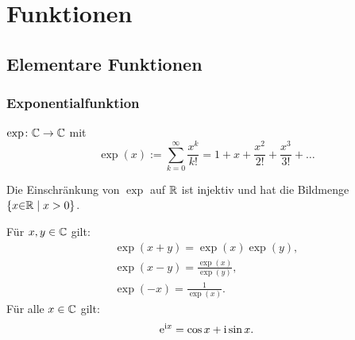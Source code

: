 
\chapter{Funktionen}
\section{Elementare Funktionen}
\subsection{Exponentialfunktion}
\begin{Definition}
$\exp\colon\mathbb C\to\mathbb C$ mit
\begin{equation}
\exp(x) := \sum_{k=0}^{\infty} \frac{x^k}{k!}
= 1+x+\frac{x^2}{2!}+\frac{x^3}{3!}+\ldots
\end{equation}
\end{Definition}
\noindent
Die Einschränkung von $\exp$ auf $\mathbb R$ ist injektiv und
hat die Bildmenge $\{x{\in}\mathbb R\mid x>0\}$.

Für $x,y\in\mathbb C$ gilt:
\begin{gather}
\exp(x+y) = \exp(x)\exp(y),\\
\exp(x-y) = \frac{\exp(x)}{\exp(y)},\\
\exp(-x) = \frac{1}{\exp(x)}.
\end{gather}
 Für alle $x\in\mathbb C$ gilt:
\begin{equation}
\mathrm e^{\mathrm i x} = \cos x+\mathrm i\sin x.
\end{equation}

